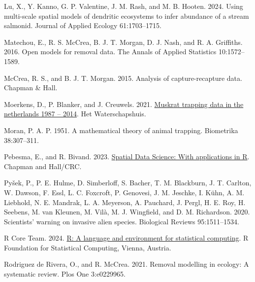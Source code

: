 \documentclass[
  11pt,
  a4paper,
]{article}
\newlength{\cslhangindent}
\newenvironment{CSLReferences}[2] %
 {\begin{list}{}{%
  \setlength{\itemindent}{0pt}
  \setlength{\leftmargin}{0pt}
  \setlength{\parsep}{0pt}
  \ifodd #1
   \setlength{\leftmargin}{\cslhangindent}
   \setlength{\itemindent}{-1\cslhangindent}
  \fi
  \setlength{\itemsep}{#2\baselineskip}}}
 {\end{list}}
\begin{document}
\begin{CSLReferences}{1}{0}
Lu, X., Y. Kanno, G. P. Valentine, J. M. Rash, and M. B. Hooten. 2024. Using multi-scale spatial models of dendritic ecosystems to infer abundance of a stream salmonid. Journal of Applied Ecology 61:1703--1715.

Matechou, E., R. S. McCrea, B. J. T. Morgan, D. J. Nash, and R. A. Griffiths. 2016. {Open models for removal data}. The Annals of Applied Statistics 10:1572--1589.

McCrea, R. S., and B. J. T. Morgan. 2015. Analysis of capture-recapture data. Chapman \& Hall.

Moerkens, D., P. Blanker, and J. Creuwels. 2021. \href{https://doi.org/10.15468/ytr96y}{Muskrat trapping data in the netherlands 1987 -- 2014}. Het Waterschapshuis.

Moran, P. A. P. 1951. A mathematical theory of animal trapping. Biometrika 38:307--311.

Pebesma, E., and R. Bivand. 2023. \href{https://doi.org/10.1201/9780429459016}{{Spatial Data Science: With applications in R}}. {Chapman and Hall/CRC}.

Pyšek, P., P. E. Hulme, D. Simberloff, S. Bacher, T. M. Blackburn, J. T. Carlton, W. Dawson, F. Essl, L. C. Foxcroft, P. Genovesi, J. M. Jeschke, I. Kühn, A. M. Liebhold, N. E. Mandrak, L. A. Meyerson, A. Pauchard, J. Pergl, H. E. Roy, H. Seebens, M. van Kleunen, M. Vilà, M. J. Wingfield, and D. M. Richardson. 2020. Scientists' warning on invasive alien species. Biological Reviews 95:1511--1534.

R Core Team. 2024. \href{https://www.R-project.org/}{R: A language and environment for statistical computing}. R Foundation for Statistical Computing, Vienna, Austria.

Rodriguez de Rivera, O., and R. McCrea. 2021. Removal modelling in ecology: A systematic review. Plos One 3:e0229965.


\end{CSLReferences}
\end{document}
